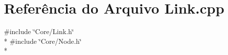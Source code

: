 \section{Referência do Arquivo Link.\+cpp}
\label{_link_8cpp}
{\ttfamily \#include \char`\"{}Core/\+Link.\+h\char`\"{}}\\*
{\ttfamily \#include \char`\"{}Core/\+Node.\+h\char`\"{}}\\*
